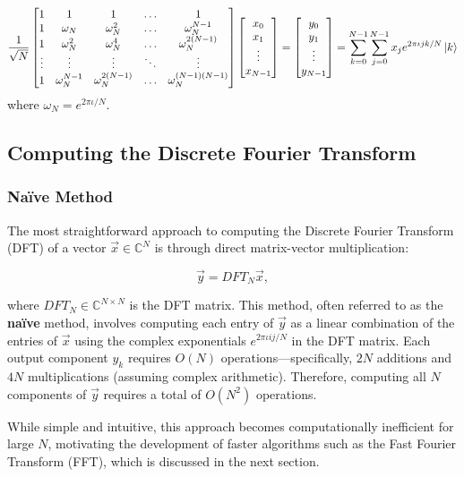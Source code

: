 \[
\dfrac{1}{\sqrt{N}}\begin{bmatrix} 1 & 1 & 1 & \ldots & 1 \\ 1 & \omega_N & \omega_N^2 & \ldots & \omega_N^{N-1} \\ 1 & \omega_N^2 & \omega_N^4 & \ldots & \omega_N^{2(N-1)} \\ \vdots & \vdots & \vdots & \ddots & \vdots \\ 1 & \omega_N^{N-1} & \omega_N^{2(N-1)} & \ldots & \omega_N^{(N-1)(N-1)} \end{bmatrix}\begin{bmatrix} x_0 \\ x_1 \\ \vdots \\ x_{N-1} \end{bmatrix} = \begin{bmatrix} y_0 \\ y_1 \\ \vdots \\ y_{N-1} \end{bmatrix} = \sum_{k=0}^{N-1} \sum_{j=0}^{N-1} x_j e^{2\pi\iota jk/N}\ket{k}
\]
where $\omega_N=e^{2\pi\iota /N}$.
\subsection{Computing the Discrete Fourier Transform}
\subsubsection{Naïve Method}

The most straightforward approach to computing the Discrete Fourier Transform (DFT) of a vector $\vec{x} \in \mathbb{C}^N$ is through direct matrix-vector multiplication:

\begin{equation}
    \vec{y} = DFT_N \vec{x},
\end{equation}

where $DFT_N \in \mathbb{C}^{N \times N}$ is the DFT matrix. This method, often referred to as the \textbf{naïve} method, involves computing each entry of $\vec{y}$ as a linear combination of the entries of $\vec{x}$ using the complex exponentials $e^{2\pi\iota ij/N}$ in the DFT matrix. Each output component $y_k$ requires $O(N)$ operations—specifically, $2N$ additions and $4N$ multiplications (assuming complex arithmetic). Therefore, computing all $N$ components of $\vec{y}$ requires a total of $O(N^2)$ operations.

While simple and intuitive, this approach becomes computationally inefficient for large $N$, motivating the development of faster algorithms such as the Fast Fourier Transform (FFT), which is discussed in the next section.

